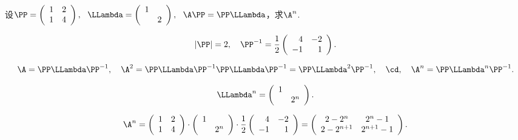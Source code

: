 \begin{li}
  设$\PP = \left(
    \begin{array}{cc}
      1 & 2\\
      1 & 4
    \end{array}
  \right), ~~ \LLambda=\left(
    \begin{array}{cc}
      1 & \\
        & 2
    \end{array}
  \right), ~~ \A\PP=\PP\LLambda$，求$\A^n$.
\end{li}
\begin{jie}
$$
|\PP|=2, \quad \PP^{-1} = \frac12 \left(
  \begin{array}{rr}
    4 & -2\\
    -1 & 1
  \end{array}
\right).
$$

$$
\A = \PP\LLambda\PP^{-1}, \quad 
\A^2 = \PP\LLambda\PP^{-1}\PP\LLambda\PP^{-1} = \PP\LLambda^2\PP^{-1}, \quad 
\cd, \quad 
\A^n = \PP\LLambda^n\PP^{-1}.
$$

$$
\LLambda^n = \left(
  \begin{array}{cc}
    1 & \\
      & 2^n
  \end{array}
\right).
$$

$$
\A^n =  \left(
  \begin{array}{cc}
    1 & 2\\
    1 & 4
  \end{array}
\right) \cdot \left(
  \begin{array}{cc}
    1 & \\
      & 2^n
  \end{array}
\right) \cdot \frac12 \left(
  \begin{array}{rr}
    4 & -2\\
    -1 & 1
  \end{array}
\right) = \left(
  \begin{array}{cc}
    2-2^n & 2^n-1\\
    2-2^{n+1} & 2^{n+1}-1
  \end{array}
\right).
$$

\end{jie}




